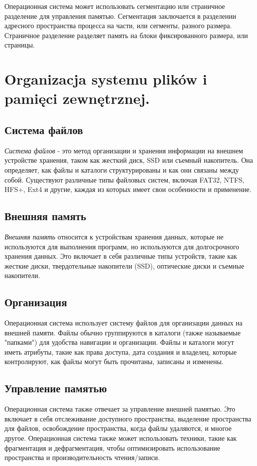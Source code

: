 Операционная система может использовать сегментацию или страничное разделение для управления памятью. Сегментация заключается в разделении адресного пространства процесса на части, или сегменты, разного размера. Страничное разделение разделяет память на блоки фиксированного размера, или страницы.


\section{Organizacja systemu plików i pamięci zewnętrznej.}
\subsection{Система файлов}

\textit{Система файлов} - это метод организации и хранения информации на внешнем устройстве хранения, таком как жесткий диск, SSD или съемный накопитель. Она определяет, как файлы и каталоги структурированы и как они связаны между собой. Существуют различные типы файловых систем, включая FAT32, NTFS, HFS+, Ext4 и другие, каждая из которых имеет свои особенности и применение.

\subsection{Внешняя память}

\textit{Внешняя память} относится к устройствам хранения данных, которые не используются для выполнения программ, но используются для долгосрочного хранения данных. Это включает в себя различные типы устройств, такие как жесткие диски, твердотельные накопители (SSD), оптические диски и съемные накопители.

\subsection{Организация}

Операционная система использует систему файлов для организации данных на внешней памяти. Файлы обычно группируются в каталоги (также называемые "папками") для удобства навигации и организации. Файлы и каталоги могут иметь атрибуты, такие как права доступа, дата создания и владелец, которые контролируют, как файлы могут быть прочитаны, записаны и изменены.

\subsection{Управление памятью}

Операционная система также отвечает за управление внешней памятью. Это включает в себя отслеживание доступного пространства, выделение пространства для файлов, освобождение пространства, когда файлы удаляются, и многое другое. Операционная система также может использовать техники, такие как фрагментация и дефрагментация, чтобы оптимизировать использование пространства и производительность чтения/записи.
